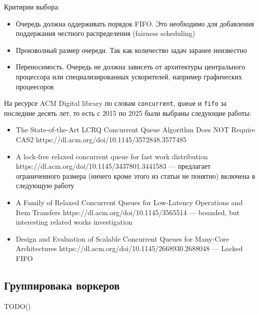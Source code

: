Критирии выбора:

\begin{itemize}
    \item Очередь должна оддерживать порядок FIFO. Это необходимо для добавления поддержания честного распределения (fairness scheduling)
    \item Произволный размер очереди. Так как количество задач заранее неизвестно
    \item Переносимость. Очередь не должна зависеть от архитектуры центрального процессора или специализированных ускорителей, например графических процеесоров
\end{itemize}

На ресурсе ACM Digital library по словам \verb|concurrent|, \verb|queue| и \verb|fifo| за последние десять лет, то есть с 2015 по 2025 были выбраны следующие работы:

\begin{itemize}
    \item The State-of-the-Art LCRQ Concurrent Queue Algorithm Does NOT Require CAS2\cite{TODO} https://dl.acm.org/doi/10.1145/3572848.3577485
    \item A lock-free relaxed concurrent queue for fast work distribution\cite{TODO}
    https://dl.acm.org/doi/10.1145/3437801.3441583 --- предлагает ограниченного размера (ничего кроме этого из статьи не понятно) включена в следующую работу\cite{TODO}
    \item A Family of Relaxed Concurrent Queues for Low-Latency Operations and Item Transfers\cite{TODO} https://dl.acm.org/doi/10.1145/3565514 --- bounded, but interesting related works investigation
    \item Design and Evaluation of Scalable Concurrent Queues for Many-Core Architectures\cite{TODO} https://dl.acm.org/doi/10.1145/2668930.2688048 --- Locked FIFO
\end{itemize}

\subsection{Группировака воркеров}

TODO()
